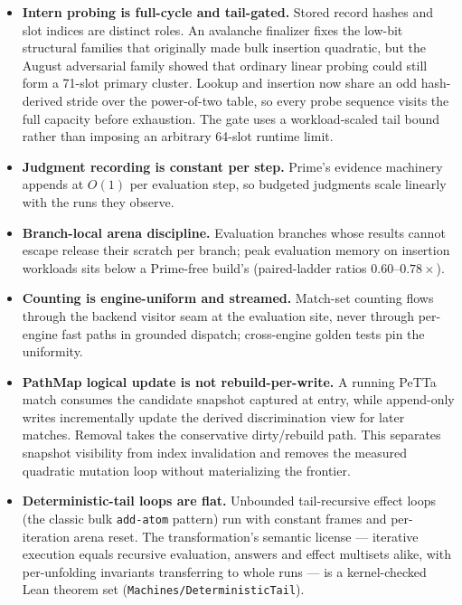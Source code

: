 \documentclass[11pt]{article}
\newcommand{\code}[1]{\texttt{#1}}
\newcommand{\PeTTa}{\textup{PeTTa}}
\begin{document}
\begin{itemize}
\item \textbf{Intern probing is full-cycle and tail-gated.}  Stored record
  hashes and slot indices are distinct roles.  An avalanche finalizer fixes
  the low-bit structural families that originally made bulk insertion
  quadratic, but the August adversarial family showed that ordinary linear
  probing could still form a 71-slot primary cluster.  Lookup and insertion
  now share an odd hash-derived stride over the power-of-two table, so every
  probe sequence visits the full capacity before exhaustion.  The gate uses
  a workload-scaled tail bound rather than imposing an arbitrary 64-slot
  runtime limit.
\item \textbf{Judgment recording is constant per step.}  Prime's
  evidence machinery appends at $O(1)$ per evaluation step, so budgeted
  judgments scale linearly with the runs they observe.
\item \textbf{Branch-local arena discipline.}  Evaluation branches whose
  results cannot escape release their scratch per branch; peak
  evaluation memory on insertion workloads sits below a Prime-free
  build's (paired-ladder ratios $0.60$--$0.78\times$).
\item \textbf{Counting is engine-uniform and streamed.}  Match-set
  counting flows through the backend visitor seam at the evaluation
  site, never through per-engine fast paths in grounded dispatch;
  cross-engine golden tests pin the uniformity.
\item \textbf{PathMap logical update is not rebuild-per-write.}  A running
  \PeTTa{} match consumes the candidate snapshot captured at entry, while
  append-only writes incrementally update the derived discrimination view
  for later matches.  Removal takes the conservative dirty/rebuild path.
  This separates snapshot visibility from index invalidation and removes
  the measured quadratic mutation loop without materializing the frontier.
\item \textbf{Deterministic-tail loops are flat.}  Unbounded
  tail-recursive effect loops (the classic bulk \code{add-atom}
  pattern) run with constant frames and per-iteration arena reset.  The
  transformation's semantic license --- iterative execution equals
  recursive evaluation, answers and effect multisets alike, with
  per-unfolding invariants transferring to whole runs --- is a
  kernel-checked Lean theorem set
  (\code{Machines/DeterministicTail}).
\end{itemize}
\end{document}
